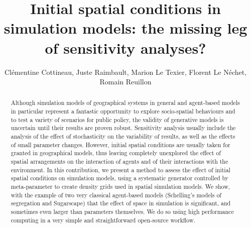 \documentclass[Afour,sageh,times]{sagej}
\begin{document}




\title{Initial spatial conditions in simulation models: the missing leg of sensitivity analyses?}

\author{Cl{\' e}mentine Cottineau, Juste Raimbault, Marion Le Texier, Florent Le N{\' e}chet, Romain Reuillon
}







\begin{abstract}
Although simulation models of geographical systems in general and agent-based models in particular represent a fantastic opportunity to explore socio-spatial behaviours and to test a variety of scenarios for public policy, the validity of generative models is uncertain until their results are proven robust. Sensitivity analysis usually include the analysis of the effect of stochasticity on the variability of results, as well as the effects of small parameter changes. However, initial spatial conditions are usually taken for granted in geographical models, thus leaving completely unexplored the effect of spatial arrangements on the interaction of agents and of their interactions with the environment. In this contribution, we present a method to assess the effect of initial spatial conditions on simulation models, using a systematic generator controlled by meta-parameter to create density grids used in spatial simulation models. We show, with the example of two very classical agent-based models (Schelling's models of segregation and Sugarscape) that the effect of space in simulation is significant, and sometimes even larger than parameters themselves. We do so using high performance computing in a very simple and straightforward open-source workflow.
\end{abstract}
\end{document}
